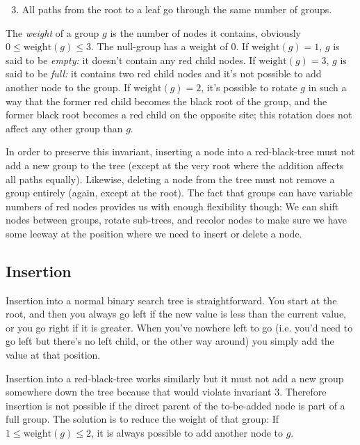 \documentclass{article}
\begin{document}
\begin{enumerate}[label=(\arabic*)]
\setcounter{enumi}{2}
\item All paths from the root to a leaf go through the same number of groups.
\end{enumerate}

The \emph{weight} of a group \(g\) is the number of nodes it contains, obviously \(0
\leq \text{weight}(g) \leq 3\). The null-group has a weight of 0. If \(\text{weight}(g)
= 1\), \(g\) is said to be \emph{empty:} it doesn't contain any red child nodes.  If
\(\text{weight}(g) = 3\), \(g\) is said to be \emph{full:} it contains two red child
nodes and it's not possible to add another node to the group.  If \(\text{weight}(g) =
2\), it's possible to rotate \(g\) in such a way that the former red child becomes the
black root of the group, and the former black root becomes a red child on the opposite
site; this rotation does not affect any other group than \(g\).

In order to preserve this invariant, inserting a node into a red-black-tree must not add
a new group to the tree (except at the very root where the addition affects all paths
equally). Likewise, deleting a node from the tree must not remove a group entirely
(again, except at the root). The fact that groups can have variable numbers of red nodes
provides us with enough flexibility though: We can shift nodes between groups, rotate
sub-trees, and recolor nodes to make sure we have some leeway at the position where we
need to insert or delete a node.

\subsection{Insertion}
Insertion into a normal binary search tree is straightforward. You start at the root,
and then you always go left if the new value is less than the current value, or you go
right if it is greater. When you've nowhere left to go (i.e. you'd need to go left but
there's no left child, or the other way around) you simply add the value at that
position.

Insertion into a red-black-tree works similarly but it must not add a new group
somewhere down the tree because that would violate invariant 3. Therefore insertion is
not possible if the direct parent of the to-be-added node is part of a full group. The
solution is to reduce the weight of that group: If \(1 \leq \text{weight}(g) \leq 2\), it is
always possible to add another node to \(g\).
\end{document}
